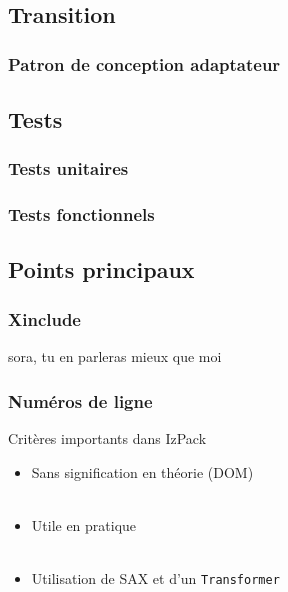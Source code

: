 \subsection{Transition}
\begin{frame}\frametitle{Patron de conception adaptateur}

\end{frame}
\subsection{Tests}
\begin{frame}\frametitle{Tests unitaires}

\end{frame}
\begin{frame}\frametitle{Tests fonctionnels}

\end{frame}
\subsection{Points principaux}
\begin{frame}\frametitle{Xinclude}
sora, tu en parleras mieux que moi
\end{frame}
\begin{frame}[fragile]\frametitle{Numéros de ligne}
\begin{beamerboxesrounded}[shadow=true]{Crit\`eres importants dans IzPack}
\begin{itemize}
	\item Sans signification en th\'eorie (DOM)\\
	~\\
	\item Utile en pratique\\
	~\\
	\item Utilisation de SAX et d'un \verb|Transformer|
\end{itemize}
\end{beamerboxesrounded}
\end{frame}
